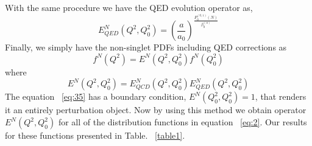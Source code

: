 \documentclass[review]{elsarticle}
\begin{document}
With the same procedure we have the QED evolution operator as,
\begin{equation}
E_{QED}^{N}(Q^{2},Q_{0}^{2})=(\frac{a}{a_{0}})^{\frac{P_{0}^{(0,1)}(N)}{\beta_{0}^{(\alpha)}}}\label{eq:33}
\end{equation}
Finally, we simply have the non-singlet PDFs including QED corrections
as
\begin{equation}
f^{N}(Q^{2})=E^{N}(Q^{2},Q_{0}^{2})f^{N}(Q_{0}^{2})\label{eq:34}
\end{equation}
where
\begin{equation}
E^{N}(Q^{2},Q_{0}^{2})=E_{QCD}^{N}(Q^{2},Q_{0}^{2})E_{QED}^{N}(Q^{2},Q_{0}^{2})\label{eq:35}
\end{equation}
The equation ~\eqref{eq:35} has a boundary condition,
$E^{N}(Q_{0}^{2},Q_{0}^{2})=1$, that renders it an entirely perturbation
object. Now by using this method we obtain operator $E^{N}(Q^{2},Q_{0}^{2})$
for all of the distribution functions in equation ~\eqref{eq:2}.
Our results for these functions presented in Table. ~\eqref{table1}.
\end{document}
